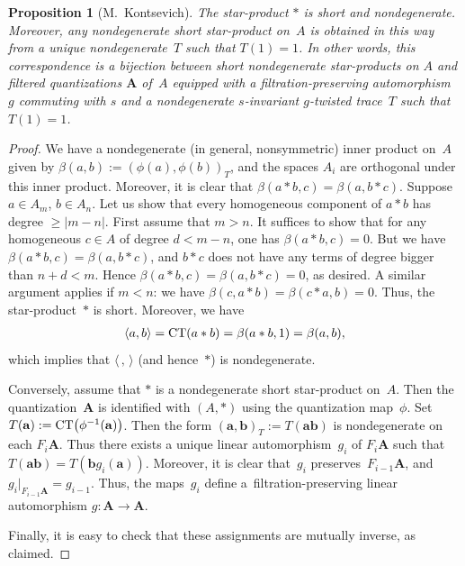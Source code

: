 \documentclass[pdftex]{sigma}
\numberwithin{equation}{section}
\newtheorem{Proposition}[Theorem]{Proposition}
\begin{document}
\begin{Proposition}[M.~Kontsevich]\label{kon} The star-product $*$ is short and nondegenerate. Moreover, any nondegenerate short star-product on~$A$ is obtained in this way from a unique nondegenerate~$T$ such that $T(1)=1$. In other words, this correspondence is a bijection between short nondegenerate star-products on $A$ and filtered quantizations ${{\mathbf A}}$ of~$A$ equipped with a filtration-preserving automorphism~$g$ commuting with $s$ and a nondegenerate $s$-invariant $g$-twisted trace~$T$ such that $T(1)=1$.
\end{Proposition}

\begin{proof} We have a nondegenerate (in general, nonsymmetric) inner product on~$A$ given by $\beta(a,b):=(\phi(a),\phi(b))_T$, and the spaces $A_i$ are orthogonal under this inner product. Moreover, it is clear that $\beta(a*b,c)=\beta(a,b*c)$. Suppose $a\in A_m$, $b\in A_n$. Let us show that every homogeneous component of $a*b$ has degree $\ge |m-n|$. First assume that $m>n$. It suffices to show that for any homogeneous $c\in A$ of degree $d<m-n$, one has $\beta(a*b,c)=0$. But we have $\beta(a*b,c)=\beta(a,b*c)$, and $b*c$ does not have any terms of degree bigger than $n+d<m$.
Hence $\beta(a*b,c)=\beta(a,b*c)=0$, as desired. A similar argument applies if $m<n$: we have $\beta(c,a*b)=\beta(c*a,b)=0$. Thus, the star-product~$*$ is short. Moreover, we have
\begin{gather*}
\langle a,b\rangle={\rm CT}(a*b)=\beta(a*b,1)=\beta(a,b),
\end{gather*}
which implies that $\langle\,,\,\rangle$ (and hence~$*$) is nondegenerate.

Conversely, assume that $*$ is a nondegenerate short star-product on~$A$. Then the quantization~${{\mathbf A}}$ is identified with $(A,*)$ using the quantization map~$\phi$. Set $T({\mathbf a}):={\rm CT}\big(\phi^{-1}({\mathbf a})\big)$. Then the form $({\textbf{a}},{\textbf{b}})_T:=T({\textbf{ab}})$ is nondegenerate on each $F_i{{\mathbf A}}$. Thus there exists a unique linear automorphism~$g_i$ of $F_i{{\mathbf A}}$ such that $T({\textbf{ab}})=T({\mathbf b}g_i({\mathbf a}))$. Moreover, it is clear that~$g_i$ preserves~$F_{i-1}{{\mathbf A}}$, and $g_i|_{F_{i-1}{{\mathbf A}}}=g_{i-1}$. Thus, the maps~$g_i$ define a~filtration-preserving linear automorphism $g\colon {{\mathbf A}}\to {{\mathbf A}}$.

Finally, it is easy to check that these assignments are mutually inverse, as claimed.
\end{proof}
\end{document}
